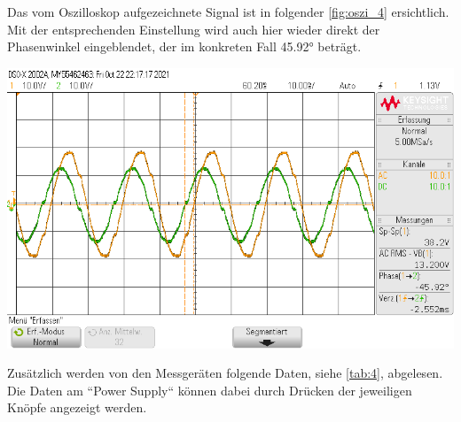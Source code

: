 \documentclass[11pt,ngerman]{scrartcl}
\begin{document}
Das vom Oszilloskop aufgezeichnete Signal ist in folgender \autoref{fig:oszi_4} ersichtlich. Mit der entsprechenden Einstellung wird auch hier wieder direkt der Phasenwinkel eingeblendet, der im konkreten Fall 45.92° beträgt.

\begin{center}
	\begin{minipage}[t]{0.7\textwidth}
		\includegraphics[width=\textwidth]{Phasenzeug/scope_13}
		\label{fig:oszi_4}
	\end{minipage}
\end{center}

Zusätzlich werden von den Messgeräten folgende Daten, siehe \autoref{tab:4}, abgelesen. Die Daten am ``Power Supply`` können dabei durch Drücken der jeweiligen Knöpfe angezeigt werden.
\end{document}
